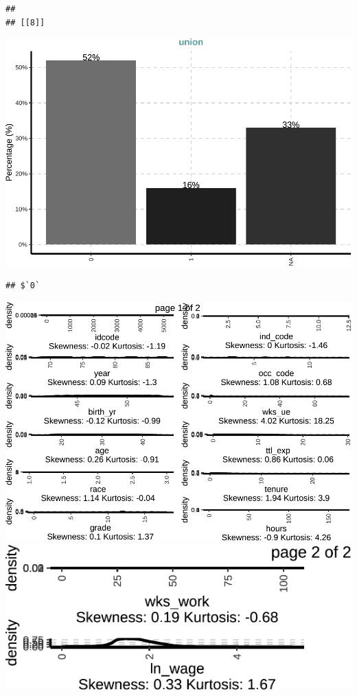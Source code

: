 \documentclass[
]{article}
\begin{document}
\begin{verbatim}
## 
## [[8]]
\end{verbatim}

\includegraphics{notebook_panel_data_files/figure-latex/Exploratory data analysis-8.pdf}

\begin{verbatim}
## $`0`
\end{verbatim}

\includegraphics{notebook_panel_data_files/figure-latex/Exploratory data analysis-9.pdf}
\includegraphics{notebook_panel_data_files/figure-latex/Exploratory data analysis-10.pdf}
\end{document}

